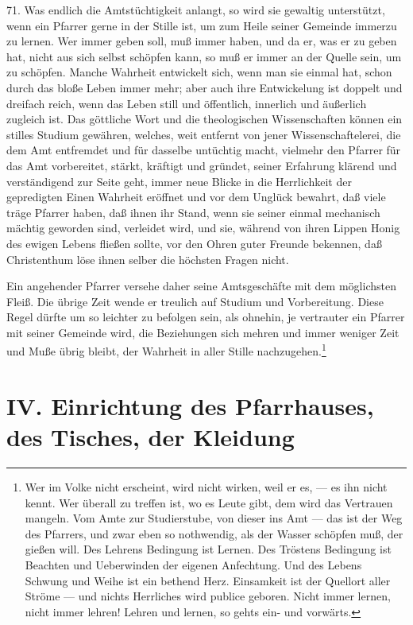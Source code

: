 71. Was endlich die Amtstüchtigkeit anlangt, so wird sie gewaltig unterstützt, wenn ein Pfarrer gerne in der Stille ist, um zum Heile seiner Gemeinde immerzu zu lernen. Wer immer geben soll, muß immer haben, und da er, was er zu geben hat, nicht aus sich selbst schöpfen kann, so muß er immer an der Quelle sein, um zu schöpfen. Manche Wahrheit entwickelt sich, wenn man sie einmal hat, schon durch das bloße Leben immer mehr; aber auch ihre Entwickelung ist doppelt und dreifach reich, wenn das Leben still und öffentlich, innerlich und äußerlich zugleich ist. Das göttliche Wort und die theologischen Wissenschaften können ein stilles Studium gewähren, welches, weit entfernt von jener Wissenschaftelerei, die dem Amt entfremdet und für dasselbe untüchtig macht, vielmehr den Pfarrer für das Amt vorbereitet, stärkt, kräftigt und gründet, seiner Erfahrung klärend und verständigend zur Seite geht, immer neue Blicke in die Herrlichkeit der gepredigten
Einen Wahrheit eröffnet und vor dem Unglück bewahrt, daß viele träge Pfarrer haben, daß ihnen ihr Stand, wenn sie seiner einmal mechanisch mächtig geworden sind, verleidet wird, und sie, während von ihren Lippen Honig des ewigen Lebens fließen sollte, vor den Ohren guter Freunde bekennen, daß Christenthum löse ihnen selber die höchsten Fragen nicht.

Ein angehender Pfarrer versehe daher seine Amtsgeschäfte mit dem möglichsten Fleiß. Die übrige Zeit wende er treulich auf Studium und Vorbereitung. Diese Regel dürfte um so leichter zu befolgen sein, als ohnehin, je vertrauter ein Pfarrer mit seiner Gemeinde wird, die Beziehungen sich mehren und immer weniger Zeit und Muße übrig bleibt, der Wahrheit in aller Stille nachzugehen.\footnote{Wer im Volke nicht erscheint, wird nicht wirken, weil er es, — es ihn nicht kennt. Wer überall zu treffen ist, wo es Leute gibt, dem wird das Vertrauen mangeln. Vom Amte zur Studierstube, von dieser ins Amt — das ist der Weg des Pfarrers, und zwar eben so nothwendig, als der Wasser schöpfen muß, der gießen will. Des Lehrens Bedingung ist Lernen. Des Tröstens Bedingung ist Beachten und Ueberwinden der eigenen Anfechtung. Und des Lebens Schwung und Weihe ist ein bethend Herz. Einsamkeit ist der Quellort aller Ströme — und nichts Herrliches wird publice geboren. Nicht immer lernen, nicht immer lehren! Lehren und lernen, so gehts ein- und vorwärts.}

\section[IV. Einrichtung des Pfarrhauses]{IV. Einrichtung des Pfarrhauses, des Tisches, der Kleidung}

